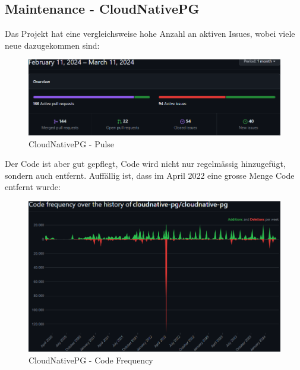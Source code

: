 
\begin{flushleft}
    \subsection{Maintenance - CloudNativePG}
    \label{subsec:maintenance_cloudnativepg}
    Das Projekt hat eine vergleichsweise hohe Anzahl an aktiven Issues, wobei viele neue dazugekommen sind:
    \begin{figure}[H]
        \centering
        \includegraphics[width=0.75\linewidth]{source/implementation/evaluation/postgresql_ha_solutions/insights/cloudnativepg/pulse_cloudnative-pg_cloudnative-pg}
        \caption{CloudNativePG - Pulse}
        \label{fig:pulse_cloudnative-pg_cloudnative-pg}
    \end{figure}

    Der Code ist aber gut gepflegt, Code wird nicht nur regelmässig hinzugefügt, sondern auch entfernt.
    Auffällig ist, dass im April 2022 eine grosse Menge Code entfernt wurde:
    \begin{figure}[H]
        \centering
        \includegraphics[width=0.75\linewidth]{source/implementation/evaluation/postgresql_ha_solutions/insights/cloudnativepg/code_frequency_cloudnative-pg_cloudnative-pg}
        \caption{CloudNativePG - Code Frequency}
        \label{fig:code_frequency_cloudnative-pg_cloudnative-pg}
    \end{figure}
\end{flushleft}
\clearpage
